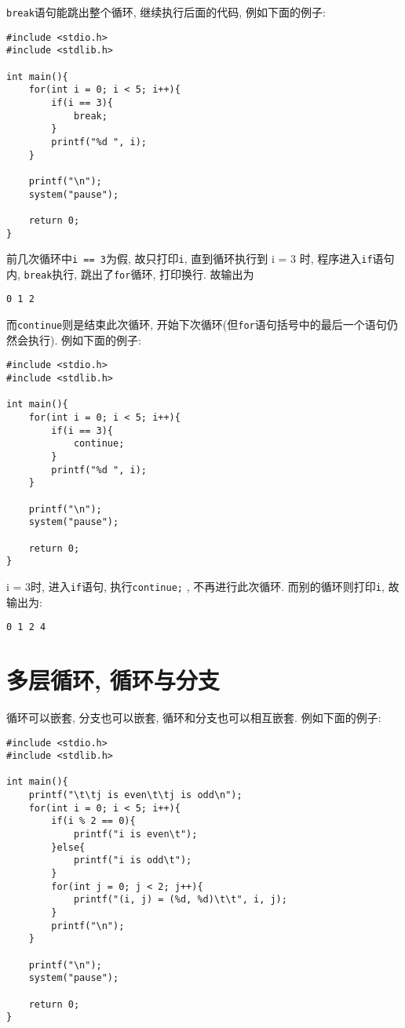            \texttt{break}语句能跳出整个循环, 继续执行后面的代码, 例如下面的例子:
\begin{lstlisting}
#include <stdio.h>
#include <stdlib.h>

int main(){
    for(int i = 0; i < 5; i++){
        if(i == 3){
            break;
        }
        printf("%d ", i);
    }

    printf("\n");
    system("pause");

    return 0;
}
\end{lstlisting}

            前几次循环中\texttt{i == 3}为假, 故只打印\texttt{i}, 直到循环执行到 i = 3 时, 程序进入\texttt{if}语句内, \texttt{break}执行, 跳出了\texttt{for}循环, 打印换行. 故输出为
\begin{lstlisting}
0 1 2 
\end{lstlisting}

            而\texttt{continue}则是结束此次循环, 开始下次循环(但\texttt{for}语句括号中的最后一个语句仍然会执行). 例如下面的例子:
\begin{lstlisting}
#include <stdio.h>
#include <stdlib.h>

int main(){
    for(int i = 0; i < 5; i++){
        if(i == 3){
            continue;
        }
        printf("%d ", i);
    }

    printf("\n");
    system("pause");

    return 0;
}
\end{lstlisting}

            i = 3时, 进入\texttt{if}语句, 执行\texttt{continue;} , 不再进行此次循环. 而别的循环则打印\texttt{i}, 故输出为:
\begin{lstlisting}
0 1 2 4 
\end{lstlisting}

    \section{多层循环, 循环与分支}
        循环可以嵌套, 分支也可以嵌套, 循环和分支也可以相互嵌套. 例如下面的例子:
\begin{lstlisting}
#include <stdio.h>
#include <stdlib.h>

int main(){
    printf("\t\tj is even\t\tj is odd\n");
    for(int i = 0; i < 5; i++){
        if(i % 2 == 0){
            printf("i is even\t");
        }else{
            printf("i is odd\t");
        }
        for(int j = 0; j < 2; j++){
            printf("(i, j) = (%d, %d)\t\t", i, j);
        }
        printf("\n");
    }

    printf("\n");
    system("pause");

    return 0;
}
\end{lstlisting}

